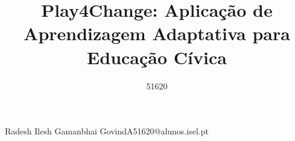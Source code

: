 \def\thetitle{%
 Play4Change: Aplicação de Aprendizagem Adaptativa para Educação Cívica
}
\def\theauthor{%
 Radesh Govind
}

\title{ \thetitle }

\author{51620}{Radesh Ilesh Gamanbhai Govind}{A51620@alunos.isel.pt}


